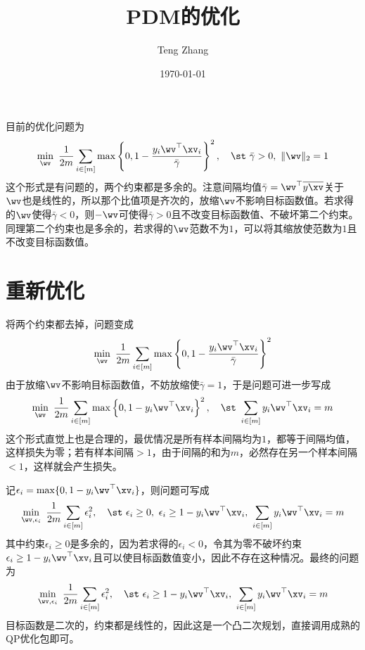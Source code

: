 \documentclass{ctexart}
\begin{document}
\title{PDM的优化}
\author{Teng Zhang}
\date{\today}
\maketitle

目前的优化问题为
\begin{align*}
    \min_{\wv} ~ \frac{1}{2m} \sum_{i \in [m]} \max \left\{ 0, 1 - \frac{y_i \wv^\top \xv_i}{\bar{\gamma}} \right\}^2, \quad \st ~ \bar{\gamma} > 0, ~ \| \wv \|_2 = 1
\end{align*}
这个形式是有问题的，两个约束都是多余的。注意间隔均值$\bar{\gamma} = \wv^\top \overline{y \xv}$关于$\wv$也是线性的，所以那个比值项是齐次的，放缩$\wv$不影响目标函数值。若求得的$\wv$使得$\bar{\gamma} < 0$，则$-\wv$可使得$\bar{\gamma} > 0$且不改变目标函数值、不破坏第二个约束。同理第二个约束也是多余的，若求得的$\wv$范数不为$1$，可以将其缩放使范数为$1$且不改变目标函数值。

\section{重新优化}

将两个约束都去掉，问题变成
\begin{align*}
    \min_{\wv} ~ \frac{1}{2m} \sum_{i \in [m]} \max \left\{ 0, 1 - \frac{y_i \wv^\top \xv_i}{\bar{\gamma}} \right\}^2
\end{align*}
由于放缩$\wv$不影响目标函数值，不妨放缩使$\bar{\gamma} = 1$，于是问题可进一步写成
\begin{align*}
    \min_{\wv} ~ \frac{1}{2m} \sum_{i \in [m]} \max \left\{ 0, 1 - y_i \wv^\top \xv_i \right\}^2, \quad \st ~ \sum_{i \in [m]} y_i \wv^\top \xv_i = m
\end{align*}
这个形式直觉上也是合理的，最优情况是所有样本间隔均为$1$，都等于间隔均值，这样损失为零；若有样本间隔$> 1$，由于间隔的和为$m$，必然存在另一个样本间隔$< 1$，这样就会产生损失。

记$\epsilon_i = \max \{ 0, 1 - y_i \wv^\top \xv_i \}$，则问题可写成
\begin{align*}
    \min_{\wv, \epsilon_i} ~ \frac{1}{2m} \sum_{i \in [m]} \epsilon_i^2, \quad \st ~ \epsilon_i \ge 0, ~ \epsilon_i \ge 1 - y_i \wv^\top \xv_i, ~ \sum_{i \in [m]} y_i \wv^\top \xv_i = m
\end{align*}
其中约束$\epsilon_i \ge 0$是多余的，因为若求得的$\epsilon_i < 0$，令其为零不破坏约束$\epsilon_i \ge 1 - y_i \wv^\top \xv_i$且可以使目标函数值变小，因此不存在这种情况。最终的问题为
\begin{align} \label{eq: primal}
    \min_{\wv, \epsilon_i} ~ \frac{1}{2m} \sum_{i \in [m]} \epsilon_i^2, \quad \st ~ \epsilon_i \ge 1 - y_i \wv^\top \xv_i, ~ \sum_{i \in [m]} y_i \wv^\top \xv_i = m
\end{align}
目标函数是二次的，约束都是线性的，因此这是一个凸二次规划，直接调用成熟的QP优化包即可。
\end{document}
